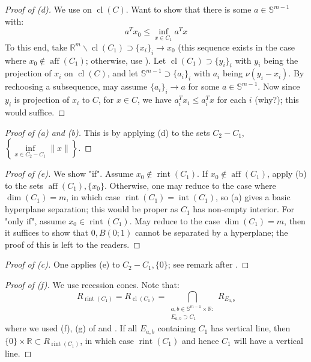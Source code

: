 \begin{proof}[Proof of (d)]
	We use  on $\operatorname{cl}(C)$. Want to show that there is some $a\in \mathbb{S}^{m-1}$ with:
	\[
		a^Tx_0\leq \underset{x\in C_1}{\operatorname{inf}}a^Tx
	\]
	To this end, take $\mathbb{R}^m\smallsetminus \operatorname{cl}(C_1)\supset \{x_i\}_i\to x_0$ (this sequence exists in the case where $x_0\notin \operatorname{aff}(C_1)$; otherwise, use ). Let $\operatorname{cl}(C_1)\supset\{y_i\}_i$ with $y_i$ being the projection of $x_i$ on $\operatorname{cl}(C)$, and let $\mathbb{S}^{m-1}\supset \{a_i\}_i$ with $a_i$ being $\nu(y_i-x_i)$. By rechoosing a subsequence, may assume $\{a_i\}_i\to a$ for some $a\in \mathbb{S}^{m-1}$. Now since $y_i$ is projection of $x_i$ to $C$, for $x\in C$, we have $a_i^Tx_i\leq a_i^Tx$ for each $i$ (why?); this would suffice.
\end{proof}
\begin{proof}[Proof of (a) and (b)]
	This is by applying (d) to the sets $C_2-C_1$, $\left\{\underset{x\in C_2-C_1}{\operatorname{inf}}\|x\|\right\}$.
\end{proof}
\begin{proof}[Proof of (e)]
	We show "if". Assume $x_0\notin \operatorname{rint}(C_1)$. If $x_0\notin \operatorname{aff}(C_1)$, apply (b) to the sets $\operatorname{aff}(C_1),\{x_0\}$. Otherwise, one may reduce to the case where $\dim(C_1)=m$, in which case $\operatorname{rint}(C_1)=\operatorname{int}(C_1)$, so (a) gives a basic hyperplane separation; this would be proper as $C_1$ has non-empty interior. For "only if", assume $x_0\in \operatorname{rint}(C_1)$. May reduce to the case $\dim(C_1)=m$, then it suffices to show that $0,B(0;1)$ cannot be separated by a hyperplane; the proof of this is left to the readers.
\end{proof}
\begin{proof}[Proof of (c)]
	One applies (e) to $C_2-C_1,\{0\}$; see remark after .
\end{proof}
\begin{proof}[Proof of (f)]
	We use recession cones. Note that:
	\[
		R_{\operatorname{rint}(C_1)}=
		R_{\operatorname{cl}(C_1)}=
		\bigcap_{\substack{a,b\in \mathbb{S}^{m-1}\times \mathbb{R}:\\E_{a,b}\supset C_1}}R_{E_{a,b}}
	\]
	where we used (f), (g) of  and . If all $E_{a,b}$ containing $C_1$ has vertical line, then $\{0\}\times\mathbb{R}\subset R_{\operatorname{rint}(C_1)}$, in which case $\operatorname{rint}(C_1)$ and hence $C_1$ will have a vertical line.
\end{proof}
